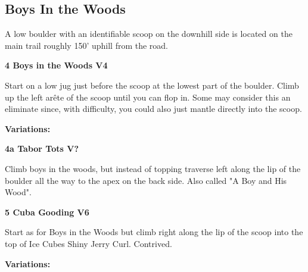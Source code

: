 	\begin{multicols}{2}


\needspace{1.5cm}
\subsection*{Boys In the Woods}\label{bf:Boys In the Woods}
A low boulder with an identifiable scoop on the downhill side is located on the main trail roughly 150' uphill from the road.\\
	


\needspace{1.5cm}
\label{rt:Boys in the Woods}
\colorbox{RoyalBlue!20}{
\parbox{0.95\linewidth}{
\textbf{
4 Boys in the Woods V4  
}}}
\begin{adjustwidth}{0.5cm}{}			
Start on a low jug just before the scoop at the lowest part of the boulder. Climb up the left arête of the scoop until you can flop in. Some may consider this an eliminate since, with difficulty, you could also just mantle directly into the scoop.
\end{adjustwidth}


\begin{adjustwidth}{0.5cm}{}				
\needspace{3cm}
\textbf{Variations:} \newline

\needspace{1.5cm}
\label{vr:Tabor Tots}
\colorbox{black!20}{
\parbox{0.95\linewidth}{
\textbf{
4a Tabor Tots V?  
}}}
\begin{adjustwidth}{0.5cm}{}			
Climb boys in the woods, but instead of topping traverse left along the lip of the boulder all the way to the apex on the back side. Also called "A Boy and His Wood".
\end{adjustwidth}



\end{adjustwidth}


\needspace{1.5cm}
\label{rt:Cuba Gooding}
\colorbox{RoyalBlue!20}{
\parbox{0.95\linewidth}{
\textbf{
5 Cuba Gooding V6  
}}}
\begin{adjustwidth}{0.5cm}{}			
Start as for Boys in the Woods but climb right along the lip of the scoop into the top of Ice Cubes Shiny Jerry Curl. Contrived.
\end{adjustwidth}


\begin{adjustwidth}{0.5cm}{}				
\needspace{3cm}
\textbf{Variations:} \newline


\end{adjustwidth}
\end{multicols}
